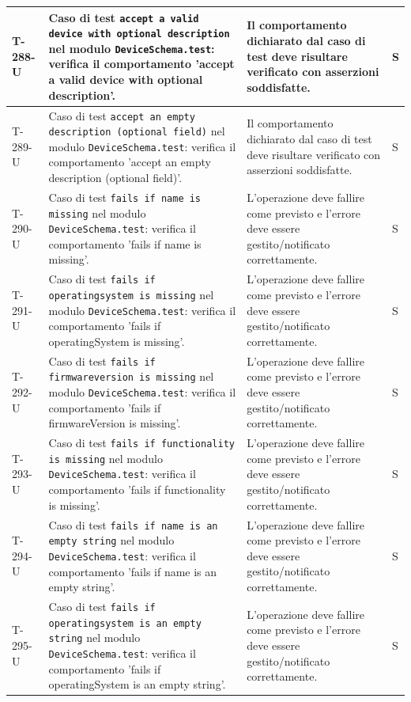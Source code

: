 \documentclass[a4paper,12pt]{article}
\begin{document}
{{\begin{longtable}{|>{\RaggedRight\arraybackslash}p{1.55cm}|>{\RaggedRight\arraybackslash}p{8.0cm}|>{\RaggedRight\arraybackslash}p{4.6cm}|>{\RaggedRight\arraybackslash}p{1.2cm}|}
        \hline
        T-288-U & Caso di test \texttt{accept a valid device with optional description} nel modulo \texttt{DeviceSchema.test}: verifica il comportamento 'accept a valid device with optional description'. & Il comportamento dichiarato dal caso di test deve risultare verificato con asserzioni soddisfatte. & S \\
        \hline
        T-289-U & Caso di test \texttt{accept an empty description (optional field)} nel modulo \texttt{DeviceSchema.test}: verifica il comportamento 'accept an empty description (optional field)'. & Il comportamento dichiarato dal caso di test deve risultare verificato con asserzioni soddisfatte. & S \\
        \hline
        T-290-U & Caso di test \texttt{fails if name is missing} nel modulo \texttt{DeviceSchema.test}: verifica il comportamento 'fails if name is missing'. & L'operazione deve fallire come previsto e l'errore deve essere gestito/notificato correttamente. & S \\
        \hline
        T-291-U & Caso di test \texttt{fails if operatingsystem is missing} nel modulo \texttt{DeviceSchema.test}: verifica il comportamento 'fails if operatingSystem is missing'. & L'operazione deve fallire come previsto e l'errore deve essere gestito/notificato correttamente. & S \\
        \hline
        T-292-U & Caso di test \texttt{fails if firmwareversion is missing} nel modulo \texttt{DeviceSchema.test}: verifica il comportamento 'fails if firmwareVersion is missing'. & L'operazione deve fallire come previsto e l'errore deve essere gestito/notificato correttamente. & S \\
        \hline
        T-293-U & Caso di test \texttt{fails if functionality is missing} nel modulo \texttt{DeviceSchema.test}: verifica il comportamento 'fails if functionality is missing'. & L'operazione deve fallire come previsto e l'errore deve essere gestito/notificato correttamente. & S \\
        \hline
        T-294-U & Caso di test \texttt{fails if name is an empty string} nel modulo \texttt{DeviceSchema.test}: verifica il comportamento 'fails if name is an empty string'. & L'operazione deve fallire come previsto e l'errore deve essere gestito/notificato correttamente. & S \\
        \hline
        T-295-U & Caso di test \texttt{fails if operatingsystem is an empty string} nel modulo \texttt{DeviceSchema.test}: verifica il comportamento 'fails if operatingSystem is an empty string'. & L'operazione deve fallire come previsto e l'errore deve essere gestito/notificato correttamente. & S \\

\end{longtable}}}
\end{document}

